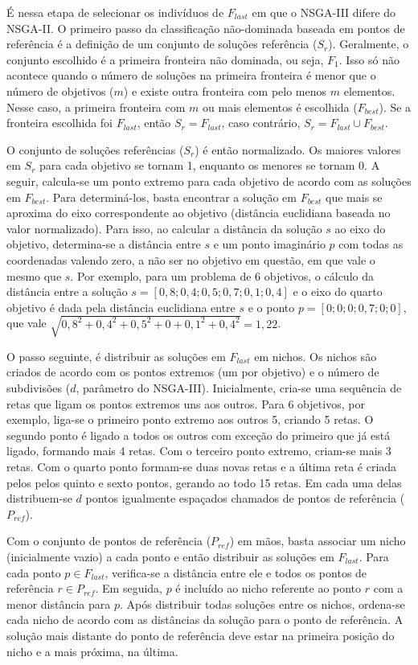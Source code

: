 É nessa etapa de selecionar os indivíduos de $F_{last}$ em que o NSGA-III difere do NSGA-II. O primeiro passo da classificação não-dominada baseada em pontos de referência é a definição de um conjunto de soluções referência ($S_r$). Geralmente, o conjunto escolhido é a primeira fronteira não dominada, ou seja, $F_1$. Isso só não acontece quando o número de soluções na primeira fronteira é menor que o número de objetivos ($m$) e existe outra fronteira com pelo menos $m$ elementos. Nesse caso, a primeira fronteira com $m$ ou mais elementos é escolhida ($F_{best}$). Se a fronteira escolhida foi $F_{last}$, então $S_r = F_{last}$, caso contrário, $S_r = F_{last} \cup F_{best}$.

O conjunto de soluções referências ($S_r$) é então normalizado. Os maiores valores em $S_r$ para cada objetivo se tornam 1, enquanto os menores se tornam 0. A seguir, calcula-se um ponto extremo para cada objetivo de acordo com as soluções em $F_{best}$. Para determiná-los, basta encontrar a solução em $F_{best}$ que mais se aproxima do eixo correspondente ao objetivo (distância euclidiana baseada no valor normalizado). Para isso, ao calcular a distância da solução $s$ ao eixo do objetivo, determina-se a distância entre $s$ e um ponto imaginário $p$ com todas as coordenadas valendo zero, a não ser no objetivo em questão, em que vale o mesmo que $s$. Por exemplo, para um problema de 6 objetivos, o cálculo da distância entre a solução $s = [0,8; 0,4; 0,5; 0,7; 0,1; 0,4]$ e o eixo do quarto objetivo é dada pela distância euclidiana entre $s$ e o ponto $p = [0; 0; 0; 0,7; 0; 0]$, que vale $\sqrt{0,8^2 + 0,4^2 + 0,5^2 + 0 + 0,1^2 + 0,4^2} = 1,22$.

O passo seguinte, é distribuir as soluções em $F_{last}$ em nichos. Os nichos são criados de acordo com os pontos extremos (um por objetivo) e o número de subdivisões ($d$, parâmetro do NSGA-III). Inicialmente, cria-se uma sequência de retas que ligam os pontos extremos uns aos outros. Para 6 objetivos, por exemplo, liga-se o primeiro ponto extremo aos outros 5, criando 5 retas. O segundo ponto é ligado a todos os outros com exceção do primeiro que já está ligado, formando mais 4 retas. Com o terceiro ponto extremo, criam-se mais 3 retas. Com o quarto ponto formam-se duas novas retas e a última reta é criada pelos pelos quinto e sexto pontos, gerando ao todo 15 retas. Em cada uma delas distribuem-se $d$ pontos igualmente espaçados chamados de pontos de referência ($P_{ref}$).

Com o conjunto de pontos de referência ($P_{ref}$) em mãos, basta associar um nicho (inicialmente vazio) a cada ponto e então distribuir as soluções em $F_{last}$. Para cada ponto $p \in F_{last}$, verifica-se a distância entre ele e todos os pontos de referência $r \in P_{ref}$. Em seguida, $p$ é incluído ao nicho referente ao ponto $r$ com a menor distância para $p$. Após distribuir todas soluções entre os nichos, ordena-se cada nicho de acordo com as distâncias da solução para o ponto de referência. A solução mais distante do ponto de referência deve estar na primeira posição do nicho e a mais próxima, na última.

